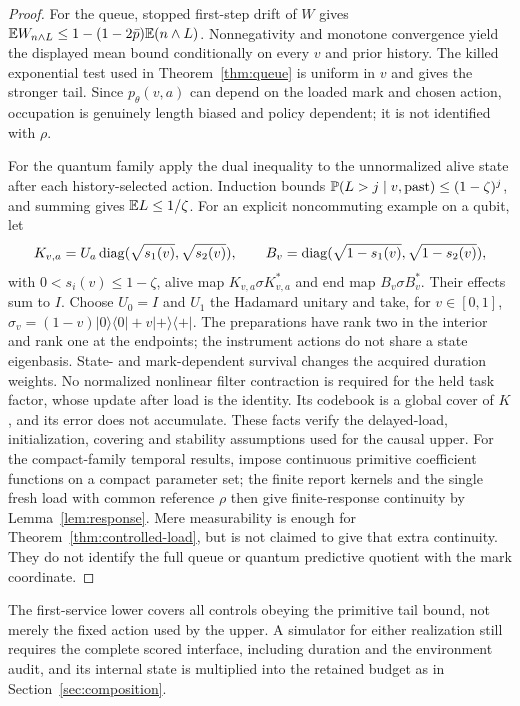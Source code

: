 \begin{proof}
For the queue, stopped first-step drift of $W$ gives
$\mathbb E W_{n\wedge L}\le1-(1-2\bar p)\mathbb E(n\wedge L)$.
Nonnegativity and monotone convergence yield the displayed mean bound conditionally on every $v$ and prior history. The killed exponential test used in Theorem~\ref{thm:queue} is uniform in $v$ and gives the stronger tail. Since $p_\theta(v,a)$ can depend on the loaded mark and chosen action, occupation is genuinely length biased and policy dependent; it is not identified with $\rho$.

For the quantum family apply the dual inequality to the unnormalized alive state after each history-selected action. Induction bounds $\mathbb P(L>j\mid v,\text{past})\le(1-\zeta)^j$, and summing gives $\mathbb E L\le1/\zeta$. For an explicit noncommuting example on a qubit, let
\[
 K_{v,a}=U_a\operatorname{diag}(\sqrt{s_1(v)},\sqrt{s_2(v)}),\qquad
 B_v=\operatorname{diag}(\sqrt{1-s_1(v)},\sqrt{1-s_2(v)}),
\]
with $0<s_i(v)\le1-\zeta$, alive map $K_{v,a}\sigma K_{v,a}^*$ and end map $B_v\sigma B_v^*$. Their effects sum to $I$. Choose $U_0=I$ and $U_1$ the Hadamard unitary and take, for $v\in[0,1]$, $\sigma_v=(1-v)|0\rangle\langle0|+v|+\rangle\langle+|$. The preparations have rank two in the interior and rank one at the endpoints; the instrument actions do not share a state eigenbasis. State- and mark-dependent survival changes the acquired duration weights. No normalized nonlinear filter contraction is required for the held task factor, whose update after load is the identity. Its codebook is a global cover of $K$, and its error does not accumulate. These facts verify the delayed-load, initialization, covering and stability assumptions used for the causal upper. For the compact-family temporal results, impose continuous primitive coefficient functions on a compact parameter set; the finite report kernels and the single fresh load with common reference $\rho$ then give finite-response continuity by Lemma~\ref{lem:response}. Mere measurability is enough for Theorem~\ref{thm:controlled-load}, but is not claimed to give that extra continuity. They do not identify the full queue or quantum predictive quotient with the mark coordinate.
\end{proof}
The first-service lower covers all controls obeying the primitive tail bound, not merely the fixed action used by the upper. A simulator for either realization still requires the complete scored interface, including duration and the environment audit, and its internal state is multiplied into the retained budget as in Section~\ref{sec:composition}.
